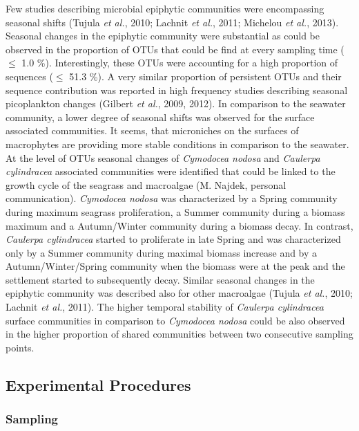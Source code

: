 \documentclass[12pt,]{article}
\begin{document}
Few studies describing microbial epiphytic communities were encompassing
seasonal shifts (Tujula \emph{et al.}, 2010; Lachnit \emph{et al.},
2011; Michelou \emph{et al.}, 2013). Seasonal changes in the epiphytic
community were substantial as could be observed in the proportion of
OTUs that could be find at every sampling time (\(\leqslant\) 1.0
\si{\percent}). Interestingly, these OTUs were accounting for a high
proportion of sequences (\(\leqslant\) 51.3 \si{\percent}). A very
similar proportion of persistent OTUs and their sequence contribution
was reported in high frequency studies describing seasonal picoplankton
changes (Gilbert \emph{et al.}, 2009, 2012). In comparison to the
seawater community, a lower degree of seasonal shifts was observed for
the surface associated communities. It seems, that microniches on the
surfaces of macrophytes are providing more stable conditions in
comparison to the seawater. At the level of OTUs seasonal changes of
\emph{Cymodocea nodosa} and \emph{Caulerpa cylindracea} associated
communities were identified that could be linked to the growth cycle of
the seagrass and macroalgae (M. Najdek, personal communication).
\emph{Cymodocea nodosa} was characterized by a Spring community during
maximum seagrass proliferation, a Summer community during a biomass
maximum and a Autumn/Winter community during a biomass decay. In
contrast, \emph{Caulerpa cylindracea} started to proliferate in late
Spring and was characterized only by a Summer community during maximal
biomass increase and by a Autumn/Winter/Spring community when the
biomass were at the peak and the settlement started to subsequently
decay. Similar seasonal changes in the epiphytic community was described
also for other macroalgae (Tujula \emph{et al.}, 2010; Lachnit \emph{et
al.}, 2011). The higher temporal stability of \emph{Caulerpa
cylindracea} surface communities in comparison to \emph{Cymodocea
nodosa} could be also observed in the higher proportion of shared
communities between two consecutive sampling points.

\newpage

\hypertarget{experimental-procedures}{%
\subsection{Experimental Procedures}\label{experimental-procedures}}

\hypertarget{sampling}{%
\subsubsection{Sampling}\label{sampling}}
\end{document}

